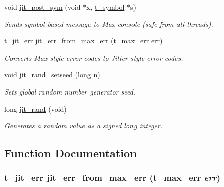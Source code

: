 \begin{DoxyCompactItemize}
void \hyperlink{group__utilitymod_ga3b56c14bcf54b8cdc384e8cc95b09c38}{jit\_\-post\_\-sym} (void $\ast$x, \hyperlink{structt__symbol}{t\_\-symbol} $\ast$s)
\begin{DoxyCompactList}\small\item\em Sends symbol based message to Max console (safe from all threads). \item\end{DoxyCompactList}\item 
t\_\-jit\_\-err \hyperlink{group__utilitymod_gaf2e27f1ee2e100777d3f66fb81b309f0}{jit\_\-err\_\-from\_\-max\_\-err} (\hyperlink{group__datatypes_ga73edaae82b318855cc09fac994918165}{t\_\-max\_\-err} err)
\begin{DoxyCompactList}\small\item\em Converts Max style error codes to Jitter style error codes. \item\end{DoxyCompactList}\item 
void \hyperlink{group__utilitymod_gaa3768df212e917ec778bf1a8af191c27}{jit\_\-rand\_\-setseed} (long n)
\begin{DoxyCompactList}\small\item\em Sets global random number generator seed. \item\end{DoxyCompactList}\item 
long \hyperlink{group__utilitymod_ga5308a31718feaa1735e673fc59f64fd0}{jit\_\-rand} (void)
\begin{DoxyCompactList}\small\item\em Generates a random value as a signed long integer. \item\end{DoxyCompactList}\end{DoxyCompactItemize}


\subsection{Function Documentation}
\hypertarget{group__utilitymod_gaf2e27f1ee2e100777d3f66fb81b309f0}{
\subsubsection[{jit\_\-err\_\-from\_\-max\_\-err}]{\setlength{\rightskip}{0pt plus 5cm}t\_\-jit\_\-err jit\_\-err\_\-from\_\-max\_\-err ({\bf t\_\-max\_\-err} {\em err})}}
\label{group__utilitymod_gaf2e27f1ee2e100777d3f66fb81b309f0}


